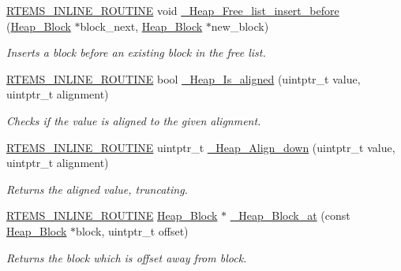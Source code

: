 \begin{DoxyCompactItemize}
\mbox{\hyperlink{group__RTEMSScoreBaseDefs_gac216239df231d5dbd15e3520b0b9313f}{R\+T\+E\+M\+S\+\_\+\+I\+N\+L\+I\+N\+E\+\_\+\+R\+O\+U\+T\+I\+NE}} void \mbox{\hyperlink{group__RTEMSScoreHeap_ga5c27f15a2fb2b9e662eba8e023e02ce8}{\+\_\+\+Heap\+\_\+\+Free\+\_\+list\+\_\+insert\+\_\+before}} (\mbox{\hyperlink{structHeap__Block}{Heap\+\_\+\+Block}} $\ast$block\+\_\+next, \mbox{\hyperlink{structHeap__Block}{Heap\+\_\+\+Block}} $\ast$new\+\_\+block)
\begin{DoxyCompactList}\small\item\em Inserts a block before an existing block in the free list. \end{DoxyCompactList}\item 
\mbox{\hyperlink{group__RTEMSScoreBaseDefs_gac216239df231d5dbd15e3520b0b9313f}{R\+T\+E\+M\+S\+\_\+\+I\+N\+L\+I\+N\+E\+\_\+\+R\+O\+U\+T\+I\+NE}} bool \mbox{\hyperlink{group__RTEMSScoreHeap_ga6a21a1797970a73dfe515f3defc5fe8d}{\+\_\+\+Heap\+\_\+\+Is\+\_\+aligned}} (uintptr\+\_\+t value, uintptr\+\_\+t alignment)
\begin{DoxyCompactList}\small\item\em Checks if the value is aligned to the given alignment. \end{DoxyCompactList}\item 
\mbox{\hyperlink{group__RTEMSScoreBaseDefs_gac216239df231d5dbd15e3520b0b9313f}{R\+T\+E\+M\+S\+\_\+\+I\+N\+L\+I\+N\+E\+\_\+\+R\+O\+U\+T\+I\+NE}} uintptr\+\_\+t \mbox{\hyperlink{group__RTEMSScoreHeap_ga2b11e4f1b69d3f6197165e4fb7f2e956}{\+\_\+\+Heap\+\_\+\+Align\+\_\+down}} (uintptr\+\_\+t value, uintptr\+\_\+t alignment)
\begin{DoxyCompactList}\small\item\em Returns the aligned value, truncating. \end{DoxyCompactList}\item 
\mbox{\hyperlink{group__RTEMSScoreBaseDefs_gac216239df231d5dbd15e3520b0b9313f}{R\+T\+E\+M\+S\+\_\+\+I\+N\+L\+I\+N\+E\+\_\+\+R\+O\+U\+T\+I\+NE}} \mbox{\hyperlink{structHeap__Block}{Heap\+\_\+\+Block}} $\ast$ \mbox{\hyperlink{group__RTEMSScoreHeap_ga231bdbf1ec3d6b82583d0cc3198fc00b}{\+\_\+\+Heap\+\_\+\+Block\+\_\+at}} (const \mbox{\hyperlink{structHeap__Block}{Heap\+\_\+\+Block}} $\ast$block, uintptr\+\_\+t offset)
\begin{DoxyCompactList}\small\item\em Returns the block which is {\itshape offset} away from {\itshape block}. \end{DoxyCompactList}\item 

\end{DoxyCompactItemize}
